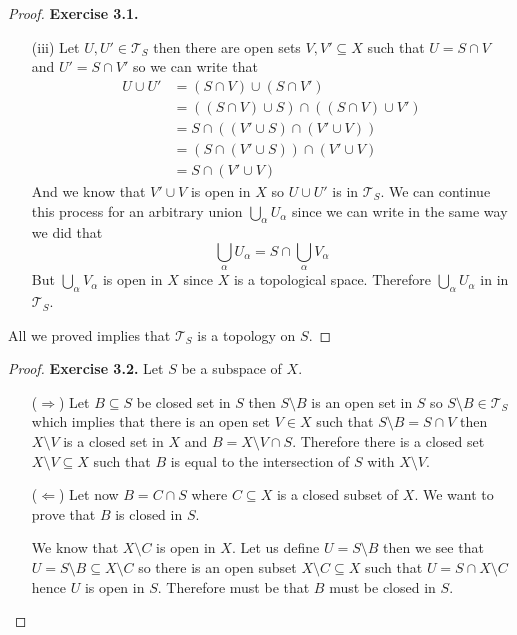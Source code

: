 \documentclass[11pt]{article}
\newcommand{\Topo}{\mathcal{T}}
\newcommand{\setmin}{\setminus}
\theoremstyle{definition}
\begin{document}
\begin{proof}{\textbf{Exercise 3.1.}}
\begin{itemize}
    \item [(iii)] Let $U, U' \in \Topo_S$ then there are open sets 
    $V, V' \subseteq X$ such that $U = S \cap V$ and $U' = S \cap V'$
    so we can write that
    \begin{align*}
        U \cup U' &= (S \cap V) \cup (S \cap V')\\
            &= ((S \cap V) \cup S) \cap ((S \cap V) \cup V')\\
            &= S \cap ((V' \cup S) \cap (V' \cup V))\\
            &= (S \cap (V' \cup S)) \cap (V' \cup V)\\
            &= S \cap (V' \cup V)
    \end{align*}
    And we know that $V'\cup V$ is open in $X$ so $U \cup U'$ is in $\Topo_S$.
    We can continue this process for an arbitrary union $\bigcup_\alpha U_\alpha$
    since we can write in the same way we did that
    $$\bigcup_\alpha U_\alpha = S \cap \bigcup_\alpha V_\alpha$$
    But $\bigcup_\alpha V_\alpha$ is open in $X$ since $X$ is a topological
    space. Therefore $\bigcup_\alpha U_\alpha$ in in $\Topo_S$.
    \end{itemize}
    All we proved implies that $\Topo_S$ is a topology on $S$.
\end{proof}
\begin{proof}{\textbf{Exercise 3.2.}}
    Let $S$ be a subspace of $X$.
    \begin{itemize}
        \item [($\Rightarrow$)] Let $B \subseteq S$ be closed set in $S$ then
        $S \setmin B$ is an open set in $S$ so $S \setmin B \in \Topo_S$
        which implies that there is an open set $V \in X$ such that 
        $S \setmin B = S \cap V$ then $X \setmin V$ is a closed set in $X$ and
        $B = X \setmin V \cap S$. Therefore there is a closed set
        $X \setmin V \subseteq X$ such that $B$ is equal to the intersection
        of $S$ with $X \setmin V$.

        \item [($\Leftarrow$)] Let now $B = C \cap S$ where $C \subseteq X$
        is a closed subset of $X$. We want to prove that $B$ is closed in $S$.
        
        We know that $X \setmin C$ is open in $X$. Let us define $U = S \setmin B$
        then we see that $U = S \setmin B \subseteq X \setmin C$ so there is
        an open subset $X \setmin C \subseteq X$ such that
        $U = S \cap X \setmin C$ hence $U$ is open in $S$.
        Therefore must be that $B$ must be closed in $S$.
    \end{itemize}
\end{proof}
\end{document}

